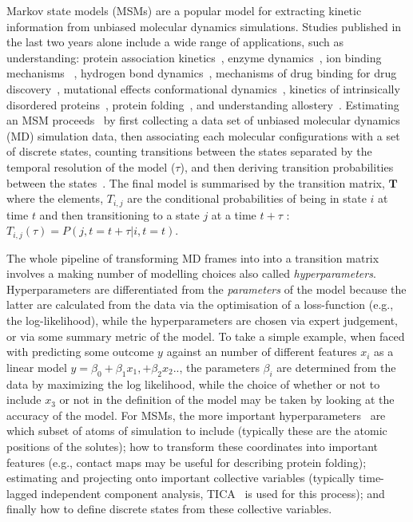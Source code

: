 \documentclass[journal=jacsat,manuscript=article]{achemso}
\begin{document}
Markov state models (MSMs) are a popular model for extracting kinetic information from unbiased molecular dynamics simulations. Studies published in the last two years alone include a wide range of applications, such as understanding:  protein association kinetics~\cite{cannariato_prediction_2022, chakrabarti_litmus_2022}, enzyme dynamics~\cite{koulgi_structural_2021}, ion binding mechanisms~\cite{dutta_distinct_2022, mckiernan_dynamical_2020} , hydrogen bond dynamics~\cite{ibrahim_dynamics_2022}, mechanisms of drug binding for drug discovery~\cite{hu_discovery_2022, pantsar_decisive_2022, hempel_molecular_2021, tosstorff_study_2020, liu_silico_2021}, mutational effects conformational dynamics~\cite{fernandez-quintero_mutation_2021, sharma_comparative_2020}, kinetics of intrinsically disordered proteins~\cite{paul_diversity_2020}, protein folding~\cite{zhou_molecular_2021}, and understanding allostery~\cite{tian_deciphering_2020}. Estimating an MSM proceeds~\cite{noe_markov_2019} by first collecting a data set of unbiased molecular dynamics (MD) simulation data, then associating each molecular configurations with a set of discrete states, counting transitions between the states separated by the temporal resolution of the model ($\tau$), and then deriving transition probabilities between the states~\cite{trendelkamp-schroer_estimation_2015}. The final model is summarised by the transition matrix, $\mathbf{T}$ where the elements, $T_{i, j}$ are the conditional probabilities of being in state $i$ at time $t$ and then transitioning to a state $j$ at a time $t+\tau$ : $T_{i,j}(\tau) = P(j, t=t+\tau| i, t=t)$.  

The whole pipeline of transforming MD frames into into a transition matrix involves a making number of modelling choices also called \emph{hyperparameters}. Hyperparameters are differentiated from the \emph{parameters} of the model because the latter are calculated from the data via the optimisation of a loss-function (e.g., the log-likelihood), while the hyperparameters are chosen via expert judgement, or via some summary metric of the model\cite{feurer2019hyperparameter}. To take a simple example, when faced with predicting some outcome $y$ against an number of different features $x_i$ as a linear model $y = \beta_0  + \beta_1 x_1, + \beta_2 x_2 ..$, the parameters $\beta_i$ are determined from the data by maximizing the log likelihood, while the choice of whether or not to include $x_3$ or not in the definition of the model may be taken by looking at the accuracy of the model.  For MSMs, the more important hyperparameters~\cite{Optimized_2016, scherer_variational_2019, husic_markov_2018} are which subset of atoms of simulation to include (typically these are the atomic positions of the solutes); how to transform these coordinates into important features (e.g., contact maps may be useful for describing protein folding); estimating and projecting onto important collective variables (typically time-lagged independent component analysis, TICA~\cite{perez-hernandezIdentificationSlowMolecular2013a} is used for this process); and finally how to define discrete states from these collective variables.  
\end{document}
